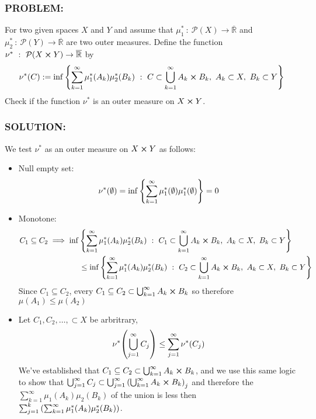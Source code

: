 \documentclass[]{article}
\newcommand{\Problem}{\subsubsection*{\textbf{PROBLEM:}}}
\newcommand{\Solution}{\subsubsection*{\textbf{SOLUTION:}}}
\newcommand{\Preliminaries}{\subsubsection*{\textbf{PRELIMINARIES:}}}
\newcommand{\R}{\mathbb{R}}
\newcommand{\st}{\ : \ }
\begin{document}
\newpage
\section{}
\Problem
For two given spaces $X$ and $Y$ and assume that $\mu_1^* \st \mathcal{P}(X) \to \overline{\R}$ and $\mu_2^* \st \mathcal{P}(Y) \to \overline{\R}$ are two outer measures.
Define the function $\nu^* \st \mathcal{P}(X \cross Y) \to \overline{\R}$ by \[
    \nu^*(C) := \inf \qty{
        \sum_{k=1}^{\infty} \mu_1^*(A_k) \mu_2^*(B_k) \st C \subset \bigcup_{k=1}^{\infty} A_k \cross B_k, 
        \ A_k \subset X, 
        \ B_k \subset Y
    }
\]
Check if the function $\nu^*$ is an outer measure on $X \cross Y$.



\Solution
We test $\nu^*$ as an outer measure on $X \cross Y$ as follows:
\begin{itemize}
    \item Null empty set: %
    \[
        \nu^*(\emptyset) = \inf \qty{
            \sum_{k=1}^{\infty} \mu_1^*(\emptyset) \mu_1^*(\emptyset)
        } = 0
    \]
    \item Monotone: %
    \begin{align*}
        C_1 \subseteq C_2 &\implies \inf \qty{
            \sum_{k=1}^{\infty} \mu_1^*(A_k) \mu_2^*(B_k) \st C_1 \subset \bigcup_{k=1}^{\infty} A_k \cross B_k, 
            \ A_k \subset X, 
            \ B_k \subset Y
        } \\
        &\qquad \qquad \leq \inf \qty{
            \sum_{k=1}^{\infty} \mu_1^*(A_k) \mu_2^*(B_k) \st C_2 \subset \bigcup_{k=1}^{\infty} A_k \cross B_k, 
            \ A_k \subset X, 
            \ B_k \subset Y
        }
    \end{align*} Since $C_1 \subseteq C_2$, every $C_1 \subseteq C_2 \subset \bigcup_{k=1}^{\infty} A_k \cross B_k$ so therefore $\mu(A_1) \leq \mu(A_2)$

    \item %
    Let $C_1,C_2,\dots,\subset X$ be arbritrary, \[
        \nu^* \qty(\bigcup_{j=1}^{\infty} C_j) \leq \sum_{j=1}^{\infty} \nu^*(C_j)
    \] We've established that $C_1 \subseteq C_2 \subset \bigcup_{k=1}^{\infty} A_k \cross B_k$, and we use this same logic to show that $\bigcup_{j=1}^{\infty} C_j \subset \bigcup_{j=1}^{\infty} \qty(\bigcup_{k=1}^{\infty} A_k \cross B_k)_j$ and therefore the $\sum_{k=1}^{\infty} \mu_1(A_k) \mu_2(B_k)$ of the union is less then $\sum_{j=1}^{k}\qty(\sum_{k=1}^{\infty} \mu_1^*(A_k) \mu_2^*(B_k))$.
\end{itemize}
\end{document}
